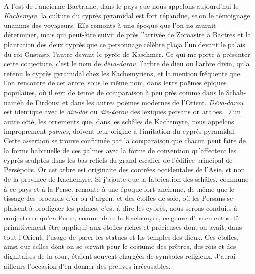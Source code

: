 \documentclass[a4paper, 11pt, oneside, polutonikogreek, french]{article}
\begin{document}
\paragraph{}
A l'est de l'ancienne Bactriane, dans le pays que nous appelons aujourd'hui le \emph{Kachemyre}, la culture du cyprès pyramidal est fort répandue, selon le témoignage unanime des voyageurs. Elle remonte à une époque que l'on ne saurait déterminer, mais qui peut-être suivit de près l'arrivée de Zoroastre à Bactres et la plantation des deux cyprès que ce personnage célèbre plaça l'un devant le palais du roi Gustasp, l'autre devant le pyrée de Kaschmer. Ce qui me porte à présenter cette conjecture, c'est le nom de \emph{dêva-darou}, l'arbre de dieu ou l'arbre divin, qu'a retenu le cyprès pyramidal chez les Kachemyriens, et la mention fréquente que l'on rencontre de cet arbre, sous le même nom, dans leurs poëmes épiques populaires, où il sert de terme de comparaison à peu près comme dans le Schah-namèh de Firdousi et dans les autres poëmes modernes de l'Orient. \emph{Dêva-darou} est identique avec le \emph{div-dar} ou \emph{div-darou} des lexiques persans ou arabes. D'un autre côté, les ornements que, dans les schâles de Kachemyre, nous appelons improprement \emph{palmes}, doivent leur origine à l'imitation du cyprès pyramidal. Cette assertion se trouve confirmée par la comparaison que chacun peut faire de la forme habituelle de ces palmes avec la forme de convention qu'affectent les cyprès sculptés dans les bas-reliefs du grand escalier de l'édifice principal de Persépolis. Or cet arbre est originaire des contrées occidentales de l'Asie, et non de la province de Kachemyre. Si j'ajoute que la fabrication des schâles, commune à ce pays et à la Perse, remonte à une époque fort ancienne, de même que le tissage des brocards d'or ou d'argent et des étoffes de soie, où les Persans se plaisent à prodiguer les palmes, c'est-à-dire les cyprès, nous serons conduits à conjecturer qu'en Perse, comme dans le Kachemyre, ce genre d'ornement a dû primitivement être appliqué aux étoffes riches et précieuses dont on avait, dans tout l'Orient, l'usage de parer les statues et les temples des dieux. Ces étoffes, ainsi que celles dont on se servait pour le costume des prêtres, des rois et des dignitaires de la cour, étaient souvent chargées de symboles religieux. J'aurai ailleurs l'occasion d'en donner des preuves irrécusables.
\end{document}

